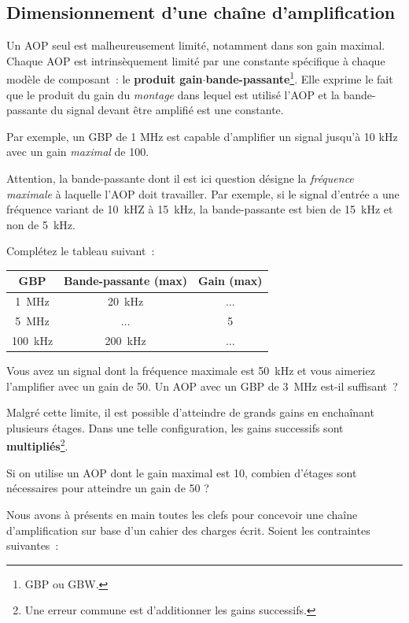 \subsection{Dimensionnement d'une chaîne d'amplification}
Un AOP seul est malheureusement limité, notamment dans son gain maximal.
Chaque AOP est intrinsèquement limité par une constante spécifique à chaque modèle de composant~: le \textbf{produit gain$\cdot$bande-passante}\footnote{GBP ou GBW.}.
Elle exprime le fait que le produit du gain du \textit{montage} dans lequel est utilisé l'AOP et la bande-passante du signal devant être amplifié est une constante.

Par exemple, un GBP de 1 MHz est capable d'amplifier un signal jusqu'à 10 kHz avec un gain \textit{maximal} de 100.

Attention, la bande-passante dont il est ici question désigne la \textit{fréquence maximale} à laquelle l'AOP doit travailler.
Par exemple, si le signal d'entrée a une fréquence variant de 10~kHZ à 15~kHz, la bande-passante est bien de 15~kHz et non de 5~kHz.

{
Complétez le tableau suivant~:
\begin{center}
\renewcommand{\arraystretch}{1.5}
\begin{tabular}{ccc}
GBP & Bande-passante (max) & Gain (max) \\ \hline
1~MHz & 20~kHz & $\dots$ \\
5~MHz & $\dots$ & 5 \\
100~kHz & 200~kHz & $\dots$ \\
\end{tabular}
\end{center}
}
{}

{
Vous avez un signal dont la fréquence maximale est 50~kHz et vous aimeriez l'amplifier avec un gain de 50.
Un AOP avec un GBP de 3~MHz est-il suffisant~?
}
{}

Malgré cette limite, il est possible d'atteindre de grands gains en enchaînant plusieurs étages.
Dans une telle configuration, les gains successifs sont \textbf{multipliés}\footnote{Une erreur commune est d'additionner les gains successifs.}.

{
Si on utilise un AOP dont le gain maximal est 10, combien d'étages sont nécessaires pour atteindre un gain de 50 ?
}
{}

Nous avons à présents en main toutes les clefs pour concevoir une chaîne d'amplification sur base d'un cahier des charges écrit.
Soient les contraintes suivantes~:

